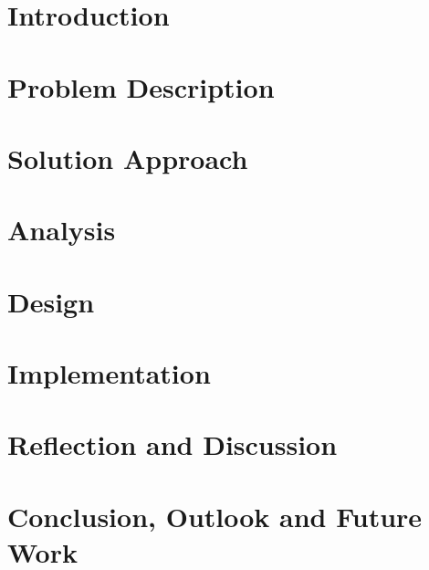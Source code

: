 
\section{Introduction} \label{sec:intro}


\section{Problem Description} \label{sec:probdesc}


\section{Solution Approach} \label{sec:solapp}


%

\section{Analysis} \label{sec:analysis}


\section{Design} \label{sec:design}


\section{Implementation} \label{sec:impl}


%

\section{Reflection and Discussion} \label{sec:reflect}


\section{Conclusion, Outlook and Future Work} \label{sec:conclusion}




\label{sec:ref}
\label{EndOfMainMatter}
\newpage

